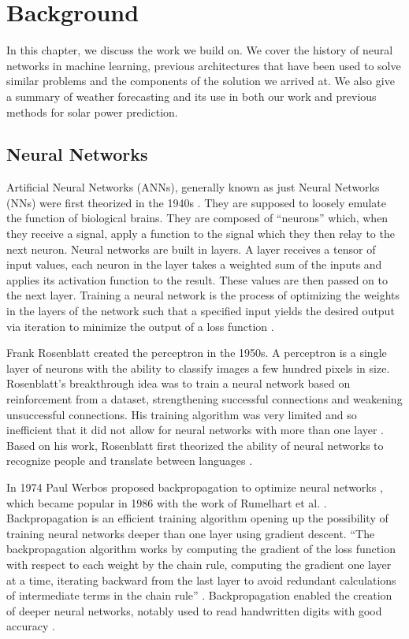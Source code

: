 \chapter{Background\label{cha:background}}
In this chapter, we discuss the work we build on. We cover the history of neural networks in machine learning, previous architectures that have been used to solve similar problems and the components of the solution we arrived at. We also give a summary of weather forecasting and its use in both our work and previous methods for solar power prediction.

\section{Neural Networks}
Artificial Neural Networks (ANNs), generally known as just Neural Networks (NNs) were first theorized in the 1940s \cite{mcculloch_logical_1943}. They are supposed to loosely emulate the function of biological brains. They are composed of \enquote{neurons} which, when they receive a signal, apply a function to the signal which they then relay to the next neuron. Neural networks are built in layers. A layer receives a tensor of input values, each neuron in the layer takes a weighted sum of the inputs and applies its activation function to the result. These values are then passed on to the next layer. Training a neural network is the process of optimizing the weights in the layers of the network such that a specified input yields the desired output via iteration to minimize the output of a loss function \cite{goodfellow_deep_2016}.

Frank Rosenblatt created the perceptron in the 1950s. A perceptron is a single layer of neurons with the ability to classify images a few hundred pixels in size. Rosenblatt's breakthrough idea was to train a neural network based on reinforcement from a dataset, strengthening successful connections and weakening unsuccessful connections. His training algorithm was very limited and so inefficient that it did not allow for neural networks with more than one layer \cite{rosenblatt_perceptron_1958}. Based on his work, Rosenblatt first theorized the ability of neural networks to recognize people and translate between languages \cite{vandeput_brief_nodate}.

In 1974 Paul Werbos proposed backpropagation to optimize neural networks \cite{Werbos:74}, which became popular in 1986  with the work of Rumelhart et al. \cite{rumelhart_learning_1986}.  Backpropagation is an efficient training algorithm opening up the possibility of training neural networks deeper than one layer using gradient descent. \enquote{The backpropagation algorithm works by computing the gradient of the loss function with respect to each weight by the chain rule, computing the gradient one layer at a time, iterating backward from the last layer to avoid redundant calculations of intermediate terms in the chain rule} \cite{noauthor_backpropagation_2022}. Backpropagation enabled the creation of deeper neural networks, notably used to read handwritten digits with good accuracy \cite{lecun_backpropagation_1989}.

